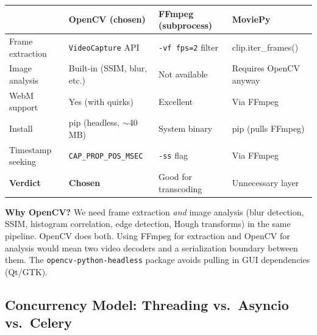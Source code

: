 \documentclass[12pt, a4paper]{article}
\newcommand{\codeinline}[1]{\texttt{\small\colorbox{codebg}{#1}}}
\begin{document}
\begin{longtable}{@{} p{3.5cm} p{4cm} p{4cm} p{3cm} @{}}
    \toprule
    & \textbf{OpenCV (chosen)} & \textbf{FFmpeg (subprocess)} & \textbf{MoviePy} \\
    \midrule
    Frame extraction & \codeinline{VideoCapture} API & \codeinline{-vf fps=2} filter & clip.iter\_frames() \\
    Image analysis & Built-in (SSIM, blur, etc.) & Not available & Requires OpenCV anyway \\
    WebM support & Yes (with quirks) & Excellent & Via FFmpeg \\
    Install & pip (headless, $\sim$40\,MB) & System binary & pip (pulls FFmpeg) \\
    Timestamp seeking & \codeinline{CAP\_PROP\_POS\_MSEC} & \codeinline{-ss} flag & Via FFmpeg \\
    \midrule
    \textbf{Verdict} & \textcolor{acceptgreen}{\textbf{Chosen}} & Good for transcoding & Unnecessary layer \\
    \bottomrule
\end{longtable}

\textbf{Why OpenCV?} We need frame extraction \textit{and} image analysis (blur detection, SSIM, histogram correlation, edge detection, Hough transforms) in the same pipeline. OpenCV does both. Using FFmpeg for extraction and OpenCV for analysis would mean two video decoders and a serialization boundary between them. The \codeinline{opencv-python-headless} package avoids pulling in GUI dependencies (Qt/GTK).

\subsection{Concurrency Model: Threading vs.\ Asyncio vs.\ Celery}
\end{document}
